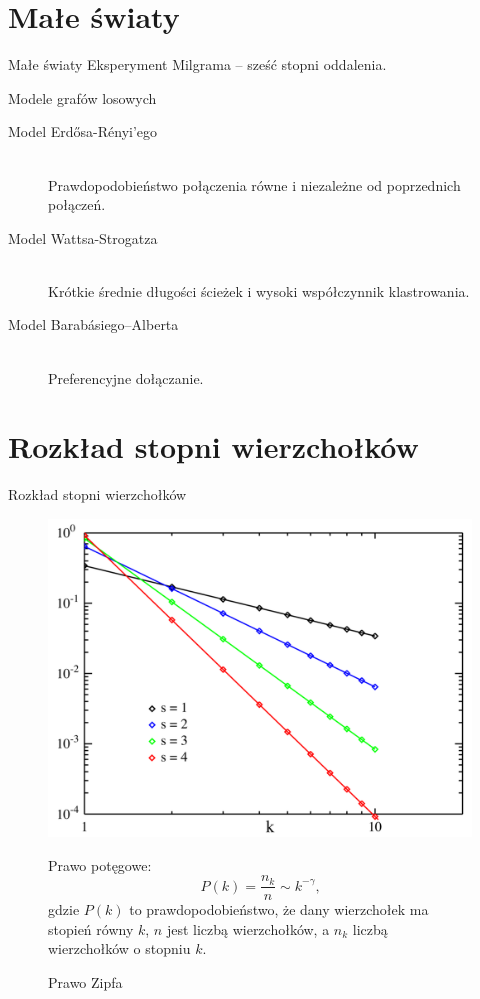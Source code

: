 \documentclass{beamer}
\begin{document}
\section{Małe światy}
\begin{frame}{Małe światy}
  Eksperyment Milgrama -- sześć stopni oddalenia.
  \pause
  \begin{block}{Modele grafów losowych}
    \begin{description}
      \item[Model Erdősa-Rényi'ego] ~\\Prawdopodobieństwo połączenia równe i niezależne od poprzednich połączeń.
      \item[Model Wattsa-Strogatza] ~\\Krótkie średnie długości ścieżek i wysoki współczynnik klastrowania.
      \item[Model Barabásiego–Alberta] ~\\Preferencyjne dołączanie.
    \end{description}
  \end{block}
\end{frame}

\section{Rozkład stopni wierzchołków}
\begin{frame}{Rozkład stopni wierzchołków}
  \begin{figure}[H]
    \centering
    \begin{minipage}[h]{0.49\textwidth}
      \centering
      \includegraphics[width=\textwidth]{zipf}
      \caption{Prawo Zipfa}
      \label{fig:path}
    \end{minipage}
    \begin{minipage}[h]{0.49\textwidth}
      Prawo potęgowe:
      \begin{equation}
        P(k) = \frac{n_k}{n} \sim k^{-\gamma} \mbox{,}
      \end{equation}
      gdzie $P(k)$ to prawdopodobieństwo, że dany wierzchołek ma stopień równy $k$, $n$ jest liczbą wierzchołków, a $n_k$ liczbą wierzchołków o stopniu $k$.
    \end{minipage}
  \end{figure}
\end{frame}
\end{document}
